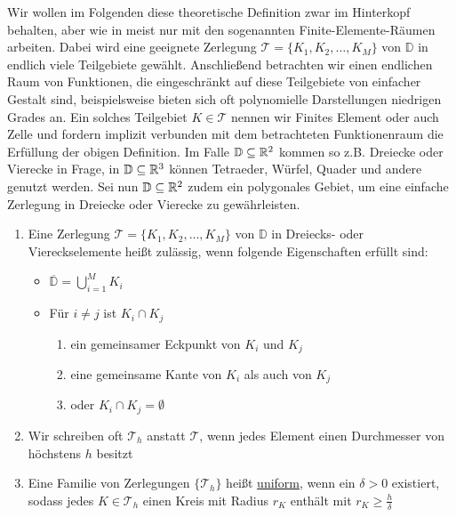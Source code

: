 Wir wollen im Folgenden diese theoretische Definition zwar im Hinterkopf behalten, aber wie in \cite{braess2013finite} meist nur mit den sogenannten Finite-Elemente-Räumen arbeiten. 
Dabei wird eine geeignete Zerlegung $\mathcal{T} = \{K_1,K_2,\dots, K_M \}$ von $\mathbb{D}$ in endlich viele Teilgebiete gewählt. 
Anschließend betrachten wir einen endlichen Raum von Funktionen, die eingeschränkt auf diese Teilgebiete von einfacher Gestalt sind, beispielsweise bieten sich oft polynomielle Darstellungen niedrigen Grades an. 
Ein solches Teilgebiet $K \in \mathcal{T}$ nennen wir Finites Element oder auch Zelle und fordern implizit verbunden mit dem betrachteten Funktionenraum die Erfüllung der obigen Definition. \newline
Im Falle $\mathbb{D} \subseteq \mathbb{R}^2$ kommen so z.B. Dreiecke oder Vierecke in Frage, in $\mathbb{D} \subseteq \mathbb{R}^3$ können Tetraeder, Würfel, Quader und andere genutzt werden. \newline
Sei nun $\mathbb{D} \subseteq \mathbb{R} ^2$ zudem ein polygonales Gebiet, um eine einfache Zerlegung in Dreiecke oder Vierecke zu gewährleisten.

\begin{Definition}
	\begin{enumerate}
		\item Eine Zerlegung $\mathcal{T} = \{ K_1,K_2,\dots,K_M\}$ von $\mathbb{D}$ in Dreiecks- oder Viereckselemente heißt zulässig, wenn folgende Eigenschaften erfüllt sind:
		\begin{itemize}
			\item $\overline{\mathbb{D}} = \bigcup_{i=1}^M K_i$
			\item Für $i \neq j$ ist $K_i\cap K_j$
			\begin{enumerate}
				\item ein gemeinsamer Eckpunkt von $K_i$ und $K_j$
				\item eine gemeinsame Kante von $K_i$ als auch von $K_j$
				\item oder $K_i\cap K_j= \emptyset$
			\end{enumerate}
			
		\end{itemize}
		\item Wir schreiben oft $\mathcal{T}_h$ anstatt $\mathcal{T}$, wenn jedes Element einen Durchmesser von höchstens $h$ besitzt 
		\item Eine Familie von Zerlegungen $ \{ \mathcal{T}_h \} $ heißt \underline{uniform}, wenn ein $ \delta > 0  $ existiert, sodass jedes $ K \in \mathcal{T}_h $ einen Kreis mit Radius $ r_K $ enthält mit $ r_K \geq \frac{h}{\delta} $
	\end{enumerate}
\end{Definition}

